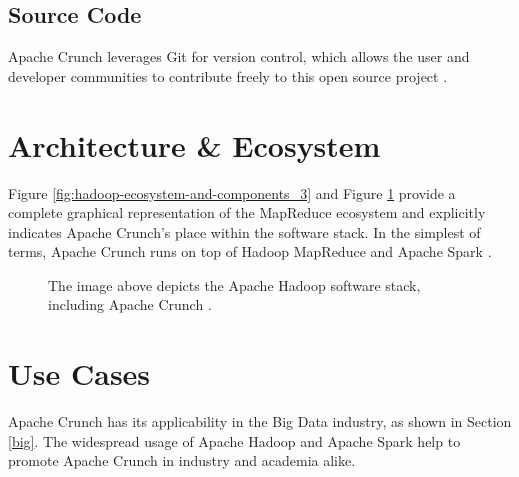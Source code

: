 \documentclass[9pt,twocolumn,twoside]{../../styles/osajnl}
\begin{document}
\subsection{Source Code}\label{source}
Apache Crunch leverages Git \CE for version control, which allows the user
and developer communities to contribute freely to this open source
project \cite{www-crunch-git}.

\section{Architecture \& Ecosystem} \label{ecosystem}
Figure \ref{fig:hadoop-ecosystem-and-components_3} and Figure
\ref{fig:architecture} provide a complete graphical representation of
the MapReduce ecosystem and explicitly indicates Apache Crunch's place
within the software stack. In the simplest of terms, Apache Crunch
runs on top of Hadoop MapReduce and Apache Spark
\cite{www-crunch-api}.
\begin{figure}[htbp]
\centering
{}
\caption{The image above depicts the Apache Hadoop software stack, including Apache Crunch \cite{www-crunch-architecture}.}
\label{fig:architecture}
\end{figure}


\section{Use Cases} \label{use}
Apache Crunch has its applicability in the Big Data industry, as shown
in Section \ref{big}. The widespread usage of Apache Hadoop and Apache
Spark help to promote Apache Crunch in industry and academia alike.
\end{document}
